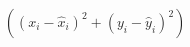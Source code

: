 \documentclass[preview]{standalone}
\begin{document}
\begin{align*}
\left((x_{i}-\hat{x}_{i})^{2}+(y_{i}-\hat{y}_{i})^{2}\right)
\end{align*}
\end{document}
